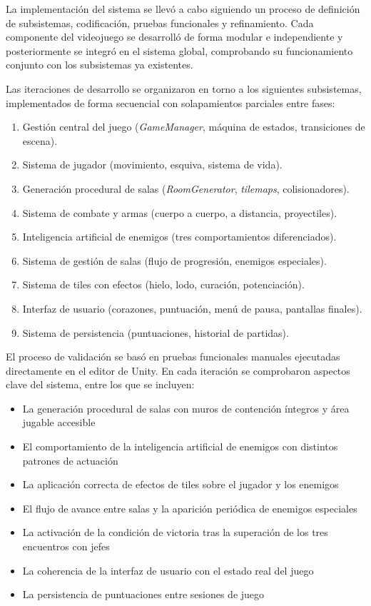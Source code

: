 La implementación del sistema se llevó a cabo siguiendo un proceso de definición de subsistemas, codificación, pruebas funcionales y refinamiento. Cada componente del videojuego se desarrolló de forma modular e independiente y posteriormente se integró en el sistema global, comprobando su funcionamiento conjunto con los subsistemas ya existentes.

Las iteraciones de desarrollo se organizaron en torno a los siguientes subsistemas, implementados de forma secuencial con solapamientos parciales entre fases:

\begin{enumerate}
\item Gestión central del juego (\textit{GameManager}, máquina de estados, transiciones de escena).
\item Sistema de jugador (movimiento, esquiva, sistema de vida).
\item Generación procedural de salas (\textit{RoomGenerator}, \textit{tilemaps}, colisionadores).
\item Sistema de combate y armas (cuerpo a cuerpo, a distancia, proyectiles).
\item Inteligencia artificial de enemigos (tres comportamientos diferenciados).
\item Sistema de gestión de salas (flujo de progresión, enemigos especiales).
\item Sistema de tiles con efectos (hielo, lodo, curación, potenciación).
\item Interfaz de usuario (corazones, puntuación, menú de pausa, pantallas finales).
\item Sistema de persistencia (puntuaciones, historial de partidas).
\end{enumerate}

El proceso de validación se basó en pruebas funcionales manuales ejecutadas directamente en el editor de Unity. En cada iteración se comprobaron aspectos clave del sistema, entre los que se incluyen:

\begin{itemize}
\item La generación procedural de salas con muros de contención íntegros y área jugable accesible
\item El comportamiento de la inteligencia artificial de enemigos con distintos patrones de actuación
\item La aplicación correcta de efectos de tiles sobre el jugador y los enemigos
\item El flujo de avance entre salas y la aparición periódica de enemigos especiales
\item La activación de la condición de victoria tras la superación de los tres encuentros con jefes
\item La coherencia de la interfaz de usuario con el estado real del juego
\item La persistencia de puntuaciones entre sesiones de juego
\end{itemize}


